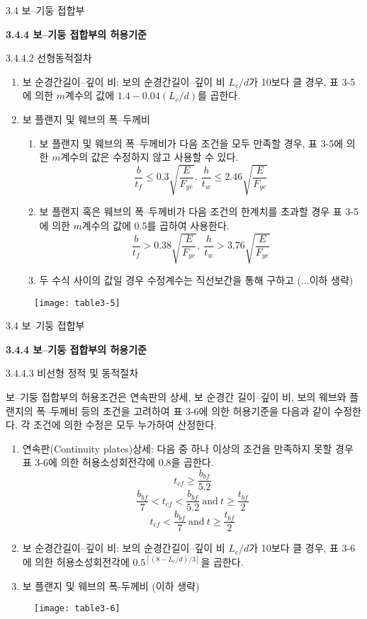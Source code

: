 	
	\begin{frame}{3.4 보--기둥 접합부}

	\textbf{3.4.4 보--기둥 접합부의 허용기준}

3.4.4.2 선형동적절차

\begin{enumerate}
	\item[(3)] 보 순경간길이--깊이 비: 보의 순경간길이--깊이 비 $L_c/d$가 10보다 클 경우, 표 3-5에 의한 $m$계수의 값에 $1.4-0.04(L_c/d)$를 곱한다. 
	\item[(4)] 보 플랜지 및 웨브의 폭--두께비
	\begin{enumerate}[label=\large\protect\textcircled{\small\arabic*}]
		\item 보 플랜지 및 웨브의 폭--두께비가 다음 조건을 모두 만족할 경우, 표 3-5에 의한 $m$계수의 값은 수정하지 않고 사용할 수 있다. 
		\[\frac{b}{t_f}\leq 0.3\sqrt{\frac{E}{F_{ye}}},~\frac{h}{t_w}\leq 2.46\sqrt{\frac{E}{F_{ye}}}\]
		\item 보 플랜지 혹은 웨브의 폭--두께비가 다음 조건의 한계치를 초과할 경우 표 3-5에 의한 $m$계수의 값에 0.5를 곱하여 사용한다. 
		\[\frac{b}{t_f}> 0.38\sqrt{\frac{E}{F_{ye}}},~\frac{h}{t_w}> 3.76\sqrt{\frac{E}{F_{ye}}}\]		
		\item 두 수식 사이의 값일 경우 수정계수는 직선보간을 통해 구하고 (...이하 생략)
	\end{enumerate}		
\end{enumerate}

	\end{frame}	
	

	\begin{frame}
	\begin{figure}
		\centering
		\texttt{[image: table3-5]}
	\end{figure}
\end{frame}



	\begin{frame}{3.4 보--기둥 접합부}

	\textbf{3.4.4 보--기둥 접합부의 허용기준}

3.4.4.3 비선형 정적 및 동적절차

보--기둥 접합부의 허용조건은 연속판의 상세, 보 순경간 길이--깊이 비, 보의 웨브와 플랜지의 폭--두께비 등의 조건을 고려하여 표 3-6에 의한
허용기준을 다음과 같이 수정한다. 각 조건에 의한 수정은 모두 누가하여 산정한다. 

\begin{enumerate}
	\item[(1)] 연속판(Continuity plates)상세: 다음 중 하나 이상의 조건을 만족하지 못할 경우 표 3-6에 의한 허용소성회전각에 0.8을 곱한다. 
			\[t_{cf} \geq \frac{b_{bf}}{5.2}\]
			\[\frac{b_{bf}}{7}<t_{cf}<\frac{b_{bf}}{5.2}~\mathrm{and}~t\geq\frac{t_{bf}}{2}\]
			\[t_{cf}<\frac{b_{bf}}{7}~\mathrm{and}~t\geq\frac{t_{bf}}{2}\]
	\item[(2)] 보 순경간길이--깊이 비: 보의 순경간길이--깊이 비 $L_c/d$가 10보다 클 경우, 표 3-6에 의한 허용소성회전각에 $0.5^{[(8-L_c/d)/3]}$을 곱한다. 
	\item[(3)] 보 플랜지 및 웨브의 폭-두께비 (이하 생략)
\end{enumerate}
	\end{frame}	
	
	
	
\begin{frame}
	\begin{figure}
		\centering
		\texttt{[image: table3-6]}
	\end{figure}
\end{frame}	
